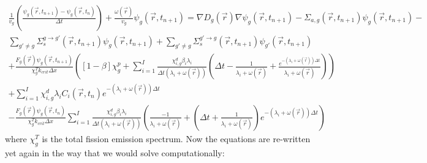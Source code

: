\documentclass[12pt]{report}
\begin{document}
	\begin{eqnarray}
	\frac{1}{v_g} \left(\frac{\psi_g(\vec{r},t_{n+1}) - \psi_g(\vec{r},t_{n})}{\Delta t} \right) + \frac{\omega(\vec{r})}{v_g} \psi_g(\vec{r},t_{n+1})  = \nabla D_g(\vec{r}) \nabla \psi_g(\vec{r},t_{n+1}) - \Sigma_{a,g}(\vec{r},t_{n+1}) \psi_g(\vec{r},t_{n+1}) -  \nonumber \\ \sum_{g'\neq g} \Sigma_{s}^{g\rightarrow g'} (\vec{r},t_{n+1}) \psi_g(\vec{r},t_{n+1}) + \sum_{g' \neq g} \Sigma_{s}^{g'\rightarrow g} (\vec{r},t_{n+1}) \psi_{g'}(\vec{r},t_{n+1}) \nonumber \\
	+ \frac{F_g(\vec{r}) \psi_g(\vec{r},t_{n+1})}{\chi_g^T k_{crit} \Delta x}  \left(\left[ 1- \beta \right] \chi_g^p + \sum_{i=1}^{I} \frac{\chi_{i,g}^d \beta_i \lambda_i}{\Delta t \left( \lambda_i + \omega(\vec{r}) \right)} \left( \Delta t - \frac{1}{\lambda_i + \omega(\vec{r})} + \frac{e^{-\left( \lambda_i + \omega(\vec{r}) \right) \Delta t}}{\lambda_i + \omega(\vec{r})}\right) \right) \nonumber \\ +  \sum_{i=1}^{I} \chi_{i,g}^d \lambda_i C_i(\vec{r},t_{n}) e^{-\left(\lambda_i + \omega(\vec{r})\right) \Delta t} \nonumber \\
	-  \frac{F_g(\vec{r}) \psi_g(\vec{r},t_{n})}{\chi_g^T k_{crit} \Delta x}  \sum_{i=1}^{I} \frac{\chi_{i,g}^d \beta_i \lambda_i}{\Delta t \left( \lambda_i + \omega(\vec{r}) \right)} \left( \frac{-1}{\lambda_i + \omega(\vec{r})} + \left(\Delta t + \frac{1}{\lambda_i + \omega(\vec{r})} \right)e^{-\left(\lambda_i + \omega(\vec{r}) \right) \Delta t} \right)
	\nonumber
	\end{eqnarray}
	where $\chi_g^T$ is the total fission emission spectrum. Now the equations are re-written yet again in the way that we would solve computationally:
\end{document}
